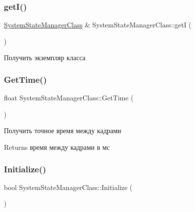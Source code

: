 \subsubsection{\texorpdfstring{get\+I()}{getI()}}
{\footnotesize\ttfamily \hyperlink{class_system_state_manager_class}{System\+State\+Manager\+Class} \& System\+State\+Manager\+Class\+::getI (\begin{DoxyParamCaption}{ }\end{DoxyParamCaption})\hspace{0.3cm}{\ttfamily [static]}}



Получить экземпляр класса 

\mbox{\label{class_system_state_manager_class_a3aaa7d15e2a88c31dce17811cd88762e}} 
\subsubsection{\texorpdfstring{Get\+Time()}{GetTime()}}
{\footnotesize\ttfamily float System\+State\+Manager\+Class\+::\+Get\+Time (\begin{DoxyParamCaption}{ }\end{DoxyParamCaption})}



Получить точное время между кадрами 

\begin{DoxyReturn}{Returns}
время между кадрами в мс 
\end{DoxyReturn}
\mbox{\label{class_system_state_manager_class_aba060cf68a7240e41a8d8d4370acf28a}} 
\subsubsection{\texorpdfstring{Initialize()}{Initialize()}}
{\footnotesize\ttfamily bool System\+State\+Manager\+Class\+::\+Initialize (\begin{DoxyParamCaption}{ }\end{DoxyParamCaption})}



